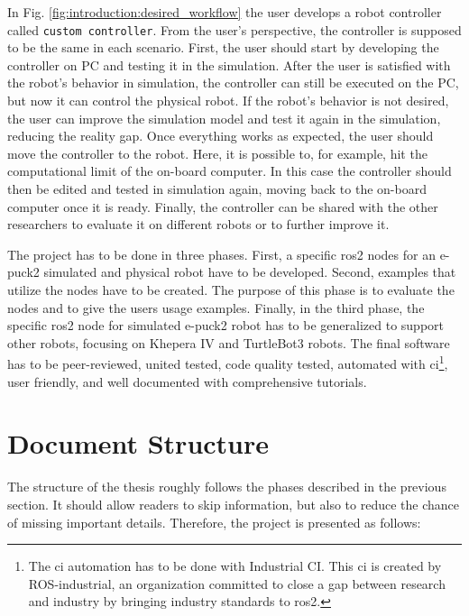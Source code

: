 In Fig. \ref{fig:introduction:desired_workflow} the user develops a robot controller called \texttt{custom controller}.
From the user's perspective, the controller is supposed to be the same in each scenario.
First, the user should start by developing the controller on PC and testing it in the simulation.
After the user is satisfied with the robot's behavior in simulation, the controller can still be executed on the PC, but now it can control the physical robot.
If the robot's behavior is not desired, the user can improve the simulation model and test it again in the simulation, reducing the reality gap.
Once everything works as expected, the user should move the controller to the robot.
Here, it is possible to, for example, hit the computational limit of the on-board computer. In this case the controller should then be edited and tested in simulation again, moving back to the on-board computer once it is ready.
Finally, the controller can be shared with the other researchers to evaluate it on different robots or to further improve it.

The project has to be done in three phases.
First, a specific \ac{ros2} nodes for an e-puck2 simulated and physical robot have to be developed.
Second, examples that utilize the nodes have to be created. 
The purpose of this phase is to evaluate the nodes and to give the users usage examples.
Finally, in the third phase, the specific \ac{ros2} node for simulated e-puck2 robot has to be generalized to support other robots, focusing on Khepera IV and TurtleBot3 robots.
The final software has to be peer-reviewed, united tested, code quality tested, automated with \ac{ci}\footnote{The \ac{ci} automation has to be done with Industrial CI. This \ac{ci} is created by ROS-industrial, an organization committed to close a gap between research and industry by bringing industry standards to \ac{ros2}.}, user friendly, and well documented with comprehensive tutorials.

\section{Document Structure}

The structure of the thesis roughly follows the phases described in the previous section.
It should allow readers to skip information, but also to reduce the chance of missing important details.
Therefore, the project is presented as follows:

